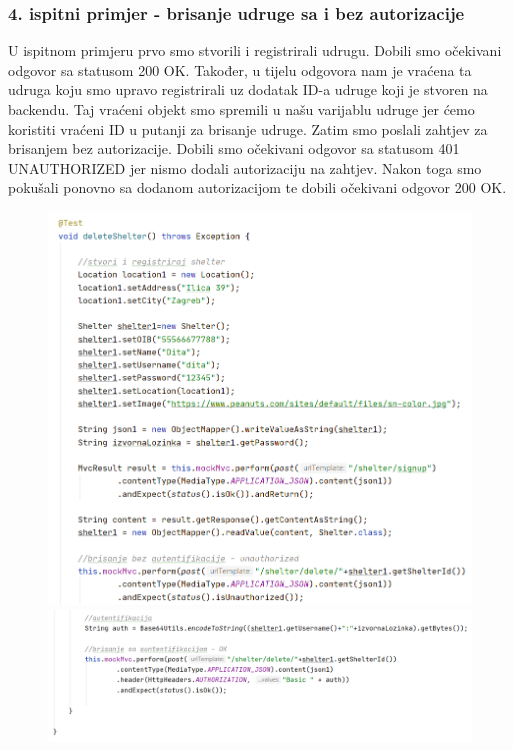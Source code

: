 			
			\subsubsection{4. ispitni primjer - brisanje udruge sa i bez autorizacije }
			
			U ispitnom primjeru prvo smo stvorili i registrirali  udrugu. Dobili smo očekivani odgovor sa statusom 200 OK. Također, u tijelu odgovora nam je vraćena ta udruga koju smo upravo registrirali uz dodatak ID-a udruge koji je stvoren na backendu. Taj vraćeni objekt smo spremili u našu varijablu udruge jer ćemo koristiti vraćeni ID u putanji za brisanje udruge. Zatim smo poslali zahtjev za brisanjem bez autorizacije. Dobili smo očekivani odgovor sa statusom 401 UNAUTHORIZED jer nismo dodali autorizaciju na zahtjev. Nakon toga smo pokušali ponovno sa dodanom autorizacijom te dobili očekivani odgovor 200 OK.
			
			\begin{figure}[H]
				\hspace*{-0.93in}
				\includegraphics[scale=0.71]{slike/shelter4.1.PNG}
				\hspace*{-0.6in}
				\includegraphics[scale=0.71]{slike/shelter4.2.PNG} %
				\centering
			\end{figure}
			
